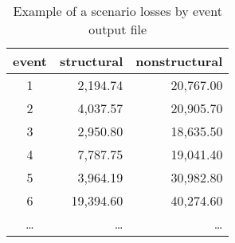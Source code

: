 \begin{table}[htbp]
\centering
\begin{tabular}{crr}

\hline
\rowcolor{lightgray}
\bf{event} & \bf{structural} & \bf{nonstructural} \\
\hline
1 & 2,194.74 & 20,767.00 \\
2 & 4,037.57 & 20,905.70 \\
3 & 2,950.80 & 18,635.50 \\
4 & 7,787.75 & 19,041.40 \\
5 & 3,964.19 & 30,982.80 \\
6 & 19,394.60  & 40,274.60 \\
\dots & \dots & \dots \\
\hline

\end{tabular}
\caption{Example of a scenario losses by event output file}
\label{output:scenario_loss_event}
\end{table}